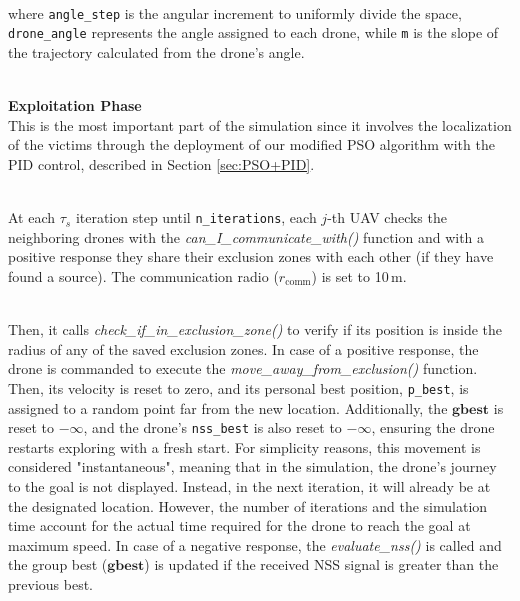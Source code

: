 \documentclass[main]{subfiles}
\begin{document}
\noindent\\
where \texttt{angle\_step} is the angular increment to uniformly divide the space,
\texttt{drone\_angle} represents the angle assigned to each drone, 
while \texttt{m} is the slope of the trajectory calculated from the drone's angle. 


\noindent\\
\textbf{Exploitation Phase}\noindent\\
This is the most important part of the simulation since it involves
the localization of the victims through the deployment of our modified PSO
algorithm with the PID control, described in Section \ref{sec:PSO+PID}.

\noindent\\
At each $\tau_s$ iteration step until \texttt{n\_iterations},
each $j$-th UAV checks the neighboring drones with the
\textit{can\_I\_communicate\_with()} function and with a 
positive response they share their exclusion zones with each other
(if they have found a source). The communication radio (\(r_{\text{comm}}\))
is set to 10\,m.

\noindent\\
Then, it calls \textit{check\_if\_in\_exclusion\_zone()}
to verify if its position is inside the radius of any of the 
saved exclusion zones.
In case of a positive response, the drone is commanded to 
execute the \textit{move\_away\_from\_exclusion()} function. 
Then, its velocity is reset to zero, and its personal 
best position, \texttt{p\_best}, is assigned to a random point 
far from the new location. Additionally, the $\mathbf{gbest}$ 
is reset to \(-\infty\), and the 
drone's \texttt{nss\_best} is also reset to \(-\infty\), 
ensuring the drone restarts exploring with a fresh start.
For simplicity reasons, this movement is considered "instantaneous", 
meaning that in the simulation, the drone's journey to the goal is 
not displayed. Instead, in the next iteration, it will already 
be at the designated location. However, the number of 
iterations and the simulation time account for the actual 
time required for the drone to reach the goal at maximum speed.
In case of a negative response, the \textit{evaluate\_nss()} is 
called and the group best ($\mathbf{gbest}$) is updated if the received NSS signal 
is greater than the previous best.
\end{document}
